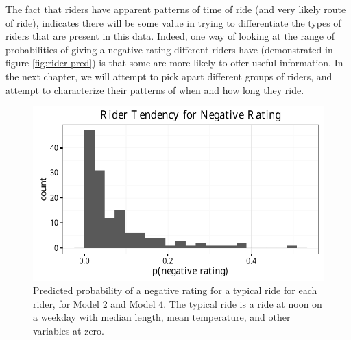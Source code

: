 \documentclass[]{article}
\begin{document}
The fact that riders have apparent patterns of time of ride (and very
likely route of ride), indicates there will be some value in trying to
differentiate the types of riders that are present in this data. Indeed,
one way of looking at the range of probabilities of giving a negative
rating different riders have (demonstrated in figure
\autoref{fig:rider-pred}) is that some are more likely to offer useful
information. In the next chapter, we will attempt to pick apart
different groups of riders, and attempt to characterize their patterns
of when and how long they ride.

\begin{figure}[tbh]
\centering
\includegraphics[angle = 0,scale = 1]{figure/rider_predictions.pdf}
\caption[Predicted probability of a negative rating for a typical ride for 
each rider, for Model 2 and Model 4. The typical ride is a ride at noon on a 
weekday with median length, mean temperature, and other variables at zero.]{\normalsize{Predicted probability of a negative rating for a typical ride for 
each rider, for Model 2 and Model 4. The typical ride is a ride at noon on a 
weekday with median length, mean temperature, and other variables at zero.}}
\label{fig:rider-pred}
\end{figure}
\end{document}
